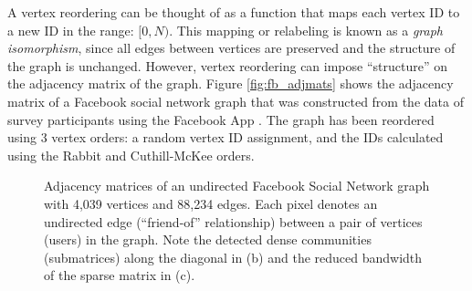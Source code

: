 \par A vertex reordering can be thought of as a function that maps each vertex ID to a new ID in the range: $[0, N)$. This mapping or relabeling is known as a \textit{graph isomorphism}, since all edges between vertices are preserved and the structure of the graph is unchanged. However, vertex reordering can impose ``structure'' on the adjacency matrix of the graph. Figure \ref{fig:fb_adjmats} shows the adjacency matrix of a Facebook social network graph that was constructed from the data of survey participants using the Facebook App \cite{leskovec2012learning}. The graph has been reordered using 3 vertex orders: a random vertex ID assignment, and the IDs calculated using the Rabbit and Cuthill-McKee orders. 

\begin{figure}[!htp]

  \centering
  \hfil   
  \hfil
  \caption{Adjacency matrices of an undirected Facebook Social Network graph with 4,039 vertices and 88,234 edges. Each pixel denotes an undirected edge (``friend-of'' relationship) between a pair of vertices (users) in the graph. Note the detected dense communities (submatrices) along the diagonal in (b) and the reduced bandwidth of the sparse matrix in (c). }\label{fig:fb_adjmats1}
  \end{figure}

